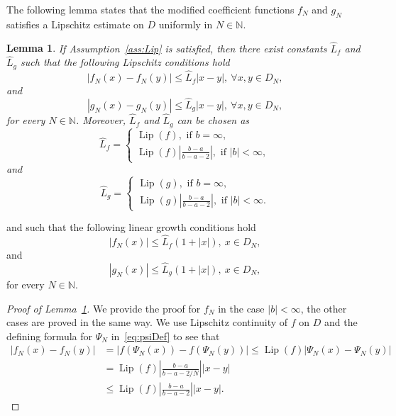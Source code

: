 \documentclass[11pt]{amsart}
\newtheorem{lemma}[theorem]{Lemma}
\newcommand{\DDN}{D_{N}}
\newcommand{\Lip}{\operatorname{Lip}}
\begin{document}
{The following lemma states that the modified coefficient functions $f_{N}$ and $g_{N}$ satisfies a Lipschitz estimate on $D$ uniformly in $N \in \mathbb{N}$.
\begin{lemma}\label{lem:fNgNLip}
If Assumption~\ref{ass:Lip} is satisfied, then there exist constants $\hat{L}_{f}$ and $\hat{L}_{g}$ such that the following Lipschitz conditions hold
\begin{equation*}
\left| f_{N}(x) - f_{N}(y) \right| \leq \hat{L}_{f} |x-y|,\ \forall x,y \in \DDN,
\end{equation*}
and
\begin{equation*}
\left| g_{N}(x) - g_{N}(y) \right| \leq \hat{L}_{g} |x-y|,\ \forall x,y \in \DDN,
\end{equation*}
for every $N \in \mathbb{N}$. Moreover, $\hat{L}_{f}$ and $\hat{L}_{g}$ can be chosen as
\begin{equation*}
\hat{L}_{f} =
\begin{cases}
\Lip(f), \text{ if } b = \infty,\\
\Lip(f) \left| \frac{b-a}{b-a-2} \right|, \text{ if } |b| < \infty,
\end{cases}
\end{equation*}
and
\begin{equation*}
\hat{L}_{g} =
\begin{cases}
\Lip(g), \text{ if } b = \infty,\\
\Lip(g) \left| \frac{b-a}{b-a-2} \right|, \text{ if } |b| < \infty.
\end{cases}
\end{equation*}
\end{lemma}
and such that the following linear growth conditions hold
\begin{equation*}
|f_{N}(x)| \leq \hat{L}_{f}(1 + |x|),\ x \in \DDN,
\end{equation*}
and
\begin{equation*}
|g_{N}(x)| \leq \hat{L}_{g}(1 + |x|),\ x \in \DDN,
\end{equation*}
for every $N \in \mathbb{N}$. 
\begin{proof}[Proof of Lemma~\ref{lem:fNgNLip}]
We provide the proof for $f_{N}$ in the case $|b|<\infty$, the other cases are proved in the same way. We use Lipschitz continuity of $f$ on $D$ and the defining formula for $\Psi_{N}$ in~\eqref{eq:psiDef} to see that
\begin{align*}
\left| f_{N}(x) - f_{N}(y) \right| &= \left| f(\Psi_{N}(x)) - f(\Psi_{N}(y)) \right| \leq \Lip(f) \left| \Psi_{N}(x) - \Psi_{N}(y) \right| \\ &= \Lip(f) \left| \frac{b-a}{b-a-2/N} \right| |x-y| \\ &\leq \Lip(f) \left| \frac{b-a}{b-a-2} \right| |x-y|.

\end{align*}
\end{proof}}
\end{document}
